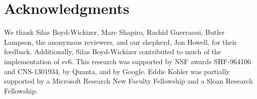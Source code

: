 \documentclass[10pt,letterpaper,twocolumn]{article}
\newcommand{\sys}{sv6\xspace}
\begin{document}





\begin{abstract}

\end{abstract}





% 







\section*{Acknowledgments}

We thank Silas Boyd-Wickizer, Marc Shapiro, Rachid Guerraoui,
Butler Lampson, the anonymous reviewers, and our
shepherd, Jon Howell, for their feedback.
%
Additionally, Silas Boyd-Wickizer contributed to much of the
implementation of \sys.
%
This research was supported by NSF awards SHF-964106 and CNS-1301934,
by Quanta, and by Google. Eddie Kohler was partially supported by a
Microsoft Research New Faculty Fellowship and a Sloan Research
Fellowship.


{


}
\end{document}
